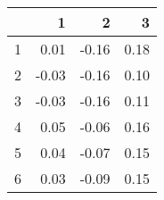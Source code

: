 \begin{table}[ht]
\begin{center}
\begin{tabular}{rrrr}
  \hline
 & 1 & 2 & 3 \\ 
  \hline
1 & 0.01 & -0.16 & 0.18 \\ 
  2 & -0.03 & -0.16 & 0.10 \\ 
  3 & -0.03 & -0.16 & 0.11 \\ 
  4 & 0.05 & -0.06 & 0.16 \\ 
  5 & 0.04 & -0.07 & 0.15 \\ 
  6 & 0.03 & -0.09 & 0.15 \\ 
   \hline
\end{tabular}
\end{center}
\end{table}
